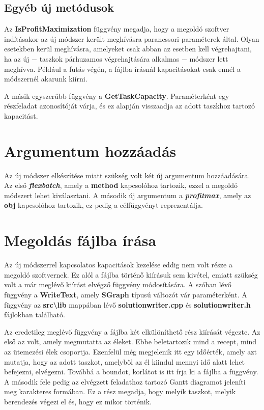 \subsection{Egyéb új metódusok}
Az \textbf{IsProfitMaximization} függvény megadja, hogy a megoldó szoftver indításakor az új módszer került meghívásra parancssori paraméterek által. Olyan esetekben kerül meghívásra, amelyeket csak abban az esetben kell végrehajtani, ha az új $-$ taszkok párhuzamos végrehajtására alkalmas $-$ módszer lett meghívva. Például a futás végén, a fájlba írásnál kapacitásokat csak ennél a módszernél akarunk kiírni.

A másik egyszerűbb függvény a \textbf{GetTaskCapacity}. Paraméterként egy részfeladat azonosítóját várja, és ez alapján visszaadja az adott taszkhoz tartozó kapacitást.

\section{Argumentum hozzáadás}
Az új módszer elkészítése miatt szükség volt két új argumentum hozzáadására.
Az első \textbf{\textit{flexbatch}}, amely a \textbf{method} kapcsolóhoz tartozik, ezzel a megoldó módszert lehet kiválasztani.
A második új argumentum a \textbf{\textit{profit\textunderscore max}}, amely az \textbf{obj} kapcsolóhoz tartozik, ez pedig a célfüggvényt reprezentálja.

\section{Megoldás fájlba írása}
Az új módszerrel kapcsolatos kapacitások kezelése eddig nem volt része a megoldó szoftvernek.
Ez alól a fájlba történő kiírásuk sem kivétel, emiatt szükség volt a már meglévő kiírást elvégző függvény módosítására.
A szóban lévő függvény a \textbf{WriteText}, amely \textbf{SGraph} típusú változót vár paraméterként.
A függvény az \textbf{src\textbackslash lib} mappában lévő \textbf{solutionwriter.cpp} és \textbf{solutionwriter.h} fájlokban található.

Az eredetileg meglévő függvény a fájlba két elkülöníthető rész kiírását végezte. Az első az volt, amely megmutatta az éleket.
Ebbe beletartozik mind a recept, mind az ütemezési élek csoportja.
Ezenfelül még megjelenik itt egy időérték, amely azt mutatja, hogy az adott taszkot, amelyből az él kiindul mennyi idő alatt lehet befejezni, elvégezni. Továbbá a boundot, korlátot is itt írja ki a fájlba a függvény.
A második fele pedig az elvégzett feladathoz tartozó Gantt diagramot jeleníti meg karakteres formában.
Ez a rész megadja, hogy melyik taszkot, melyik berendezés végezi el és, hogy ez mikor történik.

